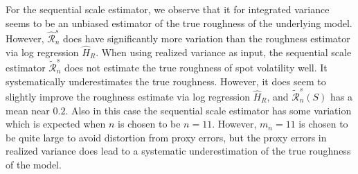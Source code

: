 \documentclass{article}
\begin{document}
For the sequential scale estimator, we observe that it for integrated variance seems to be an unbiased estimator of the true roughness of the underlying model. However, $\widehat{\mathscr{R}}_n^s$ does have significantly more variation than the roughness estimator via log regression $\widehat{H}_{R}$. When using realized variance as input, the sequential scale estimator $\widetilde{\mathscr{R}}_n^s$ does not estimate the true roughness of spot volatility well. It systematically underestimates the true roughness. However, it does seem to slightly improve the roughness estimate via log regression $\widehat{H}_{R}$, and $\widetilde{\mathscr{R}}_n^s(S)$ has a mean near $0.2$. Also in this case the sequential scale estimator has some variation which is expected when $n$ is chosen to be $n=11$. However, $m_n=11$ is chosen to be quite large to avoid distortion from proxy errors, but the proxy errors in realized variance does lead to a systematic underestimation of the true roughness of the model.
\end{document}
